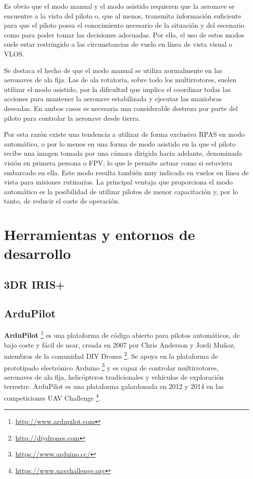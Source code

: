 Es obvio que el modo manual y el modo asistido requieren que la aeronave se encuentre a la vista del piloto o, que al menos, 
transmita información suficiente para que el piloto posea el conocimiento necesario de la situación y del escenario como para poder tomar las decisiones adecuadas. Por ello, el uso de estos modos suele estar restringido a las circunstancias de vuelo en línea de vista visual o \acs{VLOS}.

Se destaca el hecho de que el modo manual se utiliza normalmente en las aeronaves de ala fija. Las de ala rotatoria, 
sobre todo los multirrotores, suelen utilizar el modo asistido, por la dificultad que implica el coordinar todas las acciones 
para mantener la aeronave estabilizada y ejecutar las maniobras deseadas. En ambos casos es necesaria una considerable destreza 
por parte del piloto para controlar la aeronave desde tierra.

Por esta razón existe una tendencia a utilizar de forma exclusiva \acs{RPAS} en modo automático, o por lo menos en una forma de modo 
asistido en la que el piloto recibe una imagen tomada por una cámara dirigida hacia adelante, denominada visión en primera persona 
o \acs{FPV}, lo que le permite actuar como si estuviera embarcado en ella. Este modo resulta también muy indicado en vuelos en línea de vista para misiones rutinarias. La principal ventaja que proporciona el modo automático es la posibilidad de utilizar pilotos de menor capacitación y, por lo tanto, de reducir el coste de operación.

\section{Herramientas y entornos de desarrollo}
\label{herrmientas}

\subsection{3DR IRIS+}
\label{sec:3driris}

\subsection{ArduPilot}
\label{sec:ardupilot}

\textbf{ArduPilot} \footnote{\url{http://www.ardupilot.com}} es una plataforma de código abierto para pilotos automáticos, de bajo coste y fácil de usar, creada en 2007 por Chris Anderson y Jordi Muñoz, miembros de la comunidad DIY Drones \footnote{\url{http://diydrones.com}}. Se apoya en la plataforma de prototipado electrónico Arduino \footnote{\url{https://www.arduino.cc/}} y es capaz de controlar multirrotores, aeronaves de ala fija, helicópteros tradicionales y vehículos de exploración terrestre. ArduPilot es una plataforma galardonada en 2012 y 2014 en las competiciones UAV Challenge \footnote{\url{https://www.uavchallenge.org}}.

